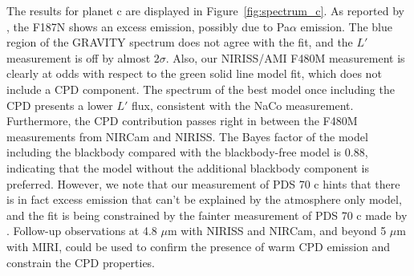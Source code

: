 \documentclass[11pt,twocolumn,twocolappendix]{aastex631}
\begin{document}
The results for planet c are displayed in Figure~\ref{fig:spectrum_c}. As reported by \cite{2024arXiv240304855C}, the F187N shows an excess emission, possibly due to Pa$\alpha$ emission. The blue region of the GRAVITY spectrum does not agree with the fit, and the $L'$ measurement is off by almost $2\sigma$. Also, our NIRISS/AMI F480M measurement is clearly at odds with respect to the green solid line model fit, which does not include a CPD component. The spectrum of the best model once including the CPD presents a lower $L'$ flux, consistent with the NaCo measurement. Furthermore, the CPD contribution passes right in between the F480M measurements from NIRCam and NIRISS. {The Bayes factor of the model including the blackbody compared with the blackbody-free model is 0.88, indicating that the model without the additional blackbody component is preferred. However, we note that our measurement of PDS 70 c hints that there is in fact excess emission that can't be explained by the atmosphere only model, and the fit is being constrained by the fainter measurement of PDS 70 c made by \cite{2024arXiv240304855C}. Follow-up observations at 4.8 $\mu$m with NIRISS and NIRCam, and beyond 5 $\mu$m with MIRI, could be used to confirm the presence of warm CPD emission and constrain the CPD properties.}  %








    
\end{document}
